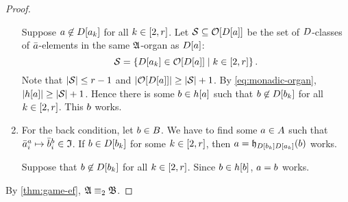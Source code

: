 \begin{proof}
\begin{enumerate}
  Suppose $a \not\in D[a_{k}]$ for all $k \in [2,r]$.
  Let $\mathcal{S} \subseteq \mathcal{O}[D[a]]$ be the set of $D$-classes of
  $\bar{a}$-elements in the same $\mathfrak{A}$-organ as $D[a]$:
  \[
    \mathcal{S} = \left\{D[a_{k}] \in \mathcal{O}[D[a]]\mathrel{}\middle|\mathrel{}k \in [2,r]\right\}.
  \]
  Note that $\left|\mathcal{S}\right| \leq r-1$ and
  $\left|\mathcal{O}[D[a]]\right| \geq \left|\mathcal{S}\right| + 1$.
  By \cref{eq:monadic-organ}, $\left|h[a]\right| \geq \left|\mathcal{S}\right| + 1$.
  Hence there is some $b \in h[a]$ such that $b \not\in
  D[b_{k}]$ for all $k \in [2,r]$. This $b$ works.
  \item For the back condition, let $b \in B$.
  We have to find some $a \in A$ such that
  $\bar{a}_{i}^{a} \mapsto \bar{b}_{i}^{b} \in \mathfrak{I}$.
  If $b \in D[b_{k}]$ for some $k \in [2,r]$,
  then $a = \mathfrak{h}_{D[b_{k}]D[a_{k}]}(b)$ works.
  
  Suppose that $b \not\in D[b_{k}]$ for all $k \in [2,r]$.
  Since $b \in h[b]$, $a = b$ works.
\end{enumerate}
By \cref{thm:game-ef}, $\mathfrak{A} \equiv_{2} \mathfrak{B}$.
\end{proof}














